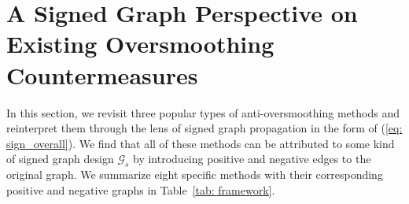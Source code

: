 \section{A Signed Graph Perspective on Existing  Oversmoothing Countermeasures} 
\label{sec: signed pers}


%


%
%








In this section, we revisit three popular types of anti-oversmoothing methods and reinterpret them through the lens of signed graph propagation in the form of (\ref{eq: sign_overall}). We find that all of these methods can be attributed to some kind of signed graph design \(\mathcal{G}_s\) by introducing positive and negative edges to the original graph.
We summarize eight specific methods with their corresponding positive and negative graphs in Table~\ref{tab: framework}.
